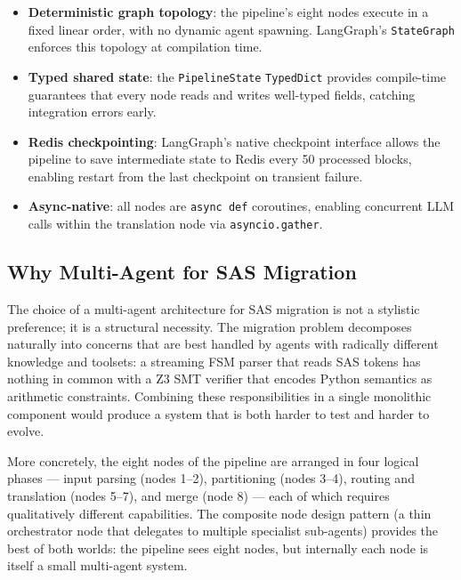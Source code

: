 \begin{itemize}
  \item \textbf{Deterministic graph topology}: the pipeline's eight nodes
    execute in a fixed linear order, with no dynamic agent spawning. LangGraph's
    \texttt{StateGraph} enforces this topology at compilation time.
  \item \textbf{Typed shared state}: the \texttt{PipelineState} \texttt{TypedDict}
    provides compile-time guarantees that every node reads and writes
    well-typed fields, catching integration errors early.
  \item \textbf{Redis checkpointing}: LangGraph's native checkpoint interface
    allows the pipeline to save intermediate state to Redis every 50 processed
    blocks, enabling restart from the last checkpoint on transient failure.
  \item \textbf{Async-native}: all nodes are \texttt{async def} coroutines,
    enabling concurrent \ac{LLM} calls within the translation node via
    \texttt{asyncio.gather}.
\end{itemize}

\subsection{Why Multi-Agent for SAS Migration}
\label{subsec:mas-justification}

The choice of a multi-agent architecture for SAS migration is not a stylistic
preference; it is a structural necessity. The migration problem decomposes
naturally into concerns that are best handled by agents with radically
different knowledge and toolsets: a streaming FSM parser that reads SAS tokens
has nothing in common with a Z3 \ac{SMT} verifier that encodes Python
semantics as arithmetic constraints. Combining these responsibilities in a
single monolithic component would produce a system that is both harder to test
and harder to evolve.

More concretely, the eight nodes of the \codara{} pipeline are arranged in
four logical phases --- input parsing (nodes 1--2), partitioning (nodes 3--4),
routing and translation (nodes 5--7), and merge (node 8) --- each of which
requires qualitatively different capabilities. The composite node design pattern
(a thin orchestrator node that delegates to multiple specialist sub-agents)
provides the best of both worlds: the pipeline sees eight nodes, but internally
each node is itself a small multi-agent system.

